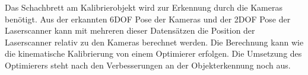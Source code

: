 Das Schachbrett am Kalibrierobjekt wird zur Erkennung durch die Kameras benötigt.
Aus der erkannten 6\ac{DOF} Pose der Kameras und der 2\ac{DOF} Pose der Laserscanner 
kann mit mehreren dieser Datensätzen die Position der Laserscanner relativ zu den
Kameras berechnet werden. Die Berechnung kann wie die kinematische Kalibrierung
von einem Optimierer erfolgen. Die Umsetzung des Optimierers steht nach den
Verbesserungen an der Objekterkennung noch aus. 

